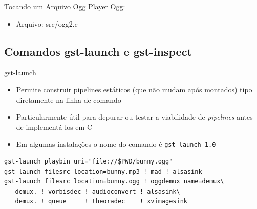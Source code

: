 \documentclass{beamer}
\let\C\lstinline
\def\en#1{\foreignlanguage{english}{\emph{#1}}}
\begin{document}
\begin{frame}[c]{Tocando um Arquivo Ogg}
  Player Ogg:
  \begin{itemize}
    \item Arquivo: src/ogg2.c
  \end{itemize}
\end{frame}

\subsection{Comandos gst-launch e gst-inspect}
\begin{frame}[fragile]{gst-launch}
  \begin{itemize}
    \item Permite construir pipelines estáticos (que não mudam após montados) tipo diretamente na linha de comando
    \item Particularmente útil para depurar ou testar a
      viabilidade de \en{pipelines} antes de implementá-los em C
    \item Em algumas instalações o nome do comando é \C{gst-launch-1.0}
  \end{itemize}

  \begin{lstlisting}[style=command,breaklines=true]
gst-launch playbin uri="file://$PWD/bunny.ogg"
gst-launch filesrc location=bunny.mp3 ! mad ! alsasink
gst-launch filesrc location=bunny.ogg ! oggdemux name=demux\
   demux. ! vorbisdec ! audioconvert ! alsasink\
   demux. ! queue     ! theoradec    ! xvimagesink
 \end{lstlisting}
\end{frame}
\end{document}
